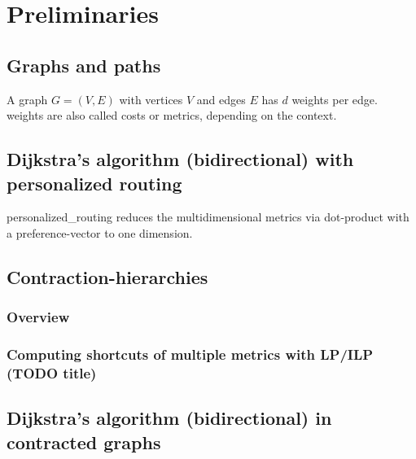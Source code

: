 \chapter{Preliminaries}
\label{chap:preliminaries}


\section{Graphs and paths}

    A graph $G = (V, E)$ with vertices $V$ and edges $E$ has $d$ \glspl{weight} per edge.
    \Glspl{weight} are also called \glspl{cost} or \glspl{metric}, depending on the context.

\section{Dijkstra's algorithm (bidirectional) with personalized routing}

    \Gls{personalized_routing} reduces the multidimensional \glspl{metric} via dot-product with a preference-vector to one dimension.

\section{Contraction-hierarchies}


    \subsection{Overview}


    \subsection{Computing shortcuts of multiple \glspl{metric} with LP/ILP (TODO title)}


\section{Dijkstra's algorithm (bidirectional) in contracted graphs}

